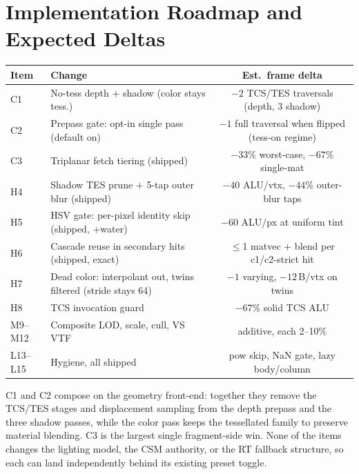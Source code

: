 \documentclass[11pt,a4paper]{article}
\begin{document}
\section{Implementation Roadmap and Expected Deltas}

\begin{table}[h]
\centering
\small
\begin{tabular}{@{}llc@{}}
\toprule
\textbf{Item} & \textbf{Change} & \textbf{Est.\ frame delta} \\
\midrule
C1 & No-tess depth $+$ shadow (color stays tess.) & $-2$ TCS/TES traversals (depth, 3 shadow) \\
C2 & Prepass gate: opt-in single pass (default on) & $-1$ full traversal when flipped (tess-on regime) \\
C3 & Triplanar fetch tiering (shipped) & $-33$\% worst-case, $-67$\% single-mat \\
H4 & Shadow TES prune $+$ 5-tap outer blur (shipped) & $-40$ ALU/vtx, $-44$\% outer-blur taps \\
H5 & HSV gate: per-pixel identity skip (shipped, +water) & $-60$ ALU/px at uniform tint \\
H6 & Cascade reuse in secondary hits (shipped, exact) & $\le$1 matvec + blend per c1/c2-strict hit \\
H7 & Dead color: interpolant out, twins filtered (stride stays 64) & $-1$ varying, $-12$\,B/vtx on twins \\
H8 & TCS invocation guard & $-67$\% solid TCS ALU \\
M9--M12 & Composite LOD, scale, cull, VS VTF & additive, each 2--10\% \\
L13--L15 & Hygiene, all shipped & pow skip, NaN gate, lazy body/column \\
\bottomrule
\end{tabular}
\end{table}

C1 and C2 compose on the geometry front-end: together they
remove the TCS/TES stages and displacement sampling from the depth prepass
and the three shadow passes, while the color pass keeps the tessellated
family to preserve material blending. C3 is the largest
single fragment-side win. None of the items changes the lighting model, the
CSM authority, or the RT fallback structure, so each can land independently
behind its existing preset toggle.

\end{document}
